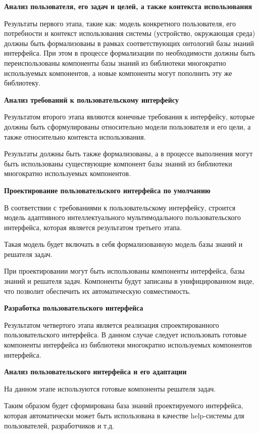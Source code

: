 \textbf{Анализ пользователя, его задач и целей, а также контекста использования}

Результаты первого этапа, такие как: модель конкретного пользователя, его потребности и контекст использования системы (устройство, окружающая среда) должны быть формализованы в рамках соответствующих онтологий базы знаний интерфейса. 
При этом в процессе формализации по необходимости должны быть переиспользованы компоненты базы знаний из библиотеки многократно используемых компонентов, а новые компоненты могут пополнить эту же библиотеку.

\textbf{Анализ требований к пользовательскому интерфейсу}

Результатом второго этапа являются конечные требования к интерфейсу, которые должны быть сформулированы относительно модели пользователя и его цели, а также относительно контекста использования.

Результаты должны быть также формализованы, а в процессе выполнения могут быть использованы существующие компонент базы знаний из библиотеки многократно используемых компонентов.

\textbf{Проектирование пользовательского интерфейса по умолчанию}

В соответствии с требованиями к пользовательскому интерфейсу, строится модель адаптивного интеллектуального мультимодального пользовательского интерфейса, которая является результатом третьего этапа.

Такая модель будет включать в себя формализованную модель базы знаний и решателя задач.

При проектировании могут быть использованы компоненты интерфейса, базы знаний и решателя задач. 
Компоненты будут записаны в унифицированном виде, что позволит обеспечить их автоматическую совместимость.

\textbf{Разработка пользовательского интерфейса}

Результатом четвертого этапа является реализация спроектированного пользовательского интерфейса. В данном случае следует использовать готовые компоненты интерфейса из библиотеки многократно используемых компонентов интерфейса.

\textbf{Анализ пользовательского интерфейса и его адаптации}

На данном этапе используются готовые компоненты решателя задач.

Таким образом будет сформирована база знаний проектируемого интерфейса, которая автоматически может быть использована в качестве help-системы для пользователей, разработчиков и т.д.

